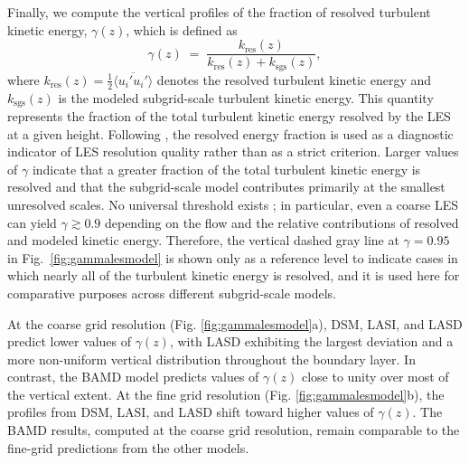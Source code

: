 \documentclass[%
superscriptaddress,
 amsmath,amssymb,
pra,
showkeys,
]{revtex4-2}
\begin{document}
Finally, we compute the vertical profiles of the fraction of resolved turbulent kinetic energy, $\gamma(z)$, which is defined as
\begin{equation}
\gamma(z) \;=\; \frac{k_{\mathrm{res}}(z)}{k_{\mathrm{res}}(z) + k_{\mathrm{sgs}}(z)},
\end{equation}
where $k_{\mathrm{res}}(z) = \tfrac{1}{2}\langle \overline {u_i' u_i'} \rangle$ denotes the resolved turbulent kinetic energy and $k_{\mathrm{sgs}}(z)$ is the modeled subgrid-scale turbulent kinetic energy. This quantity represents the fraction of the total turbulent kinetic energy resolved by the LES at a given height. Following \citet{Pope_2000}, the resolved energy fraction is used as a diagnostic indicator of LES resolution quality rather than as a strict criterion. Larger values of $\gamma$ indicate that a greater fraction of the total turbulent kinetic energy is resolved and that the subgrid-scale model contributes primarily at the smallest unresolved scales. No universal threshold exists \cite{wurps2020grid, davidson2009large, singh2023large}; in particular, even a coarse LES can yield $\gamma \gtrsim 0.9$ depending on the flow and the relative contributions of resolved and modeled kinetic energy. Therefore, the vertical dashed gray line at $\gamma = 0.95$ in Fig.~\ref{fig:gammalesmodel} is shown only as a reference level
to indicate cases in which nearly all of the turbulent kinetic energy is resolved, and it is used here for comparative purposes across different subgrid-scale models.

At the coarse grid resolution (Fig. \ref{fig:gammalesmodel}a), DSM, LASI, and LASD predict lower values of $\gamma(z)$, with LASD exhibiting the largest deviation and a more non-uniform vertical distribution throughout the boundary layer. In contrast, the BAMD model predicts values of $\gamma(z)$ close to unity over most of the vertical extent. At the fine grid resolution (Fig. \ref{fig:gammalesmodel}b), the profiles from DSM, LASI, and LASD shift toward higher values of $\gamma(z)$. The BAMD results, computed at the coarse grid resolution, remain comparable to the fine-grid predictions from the other models. %
\end{document}
